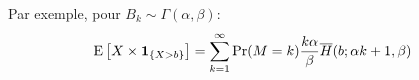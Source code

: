 \documentclass[10pt, french]{article}
\begin{document}
\begin{multicols*}{2}
\begin{definitionNOHFILL}
Par exemple, pour $B_{k}	\sim	\Gamma(\alpha,	\beta)$:
\begin{align*}
	\mathrm{E} \left[ X	\times	\bm{1}_{\{X	>	b\}} \right]
	&=	\sum_{k	=	1}^{\infty} \Pr(M	=	k) \frac{k\alpha}{\beta} \overline{H}(b;	\alpha k + 1, \beta)
\end{align*}
\end{definitionNOHFILL}

\end{multicols*}
\end{document}

